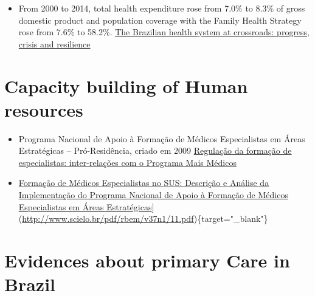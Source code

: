 \documentclass[]{book}
\providecommand{\tightlist}{%
  \setlength{\itemsep}{0pt}\setlength{\parskip}{0pt}}
\begin{document}
\begin{itemize}
\tightlist
\item
  From 2000 to 2014, total health expenditure rose from 7.0\% to 8.3\% of gross domestic product and population coverage with the Family Health Strategy rose from 7.6\% to 58.2\%. \href{https://www.ncbi.nlm.nih.gov/pmc/articles/PMC6035510/pdf/bmjgh-2018-000829.pdf}{The Brazilian health system at crossroads: progress, crisis and resilience}
\end{itemize}

\hypertarget{capacity-building-of-human-resources}{%
\section*{Capacity building of Human resources}\label{capacity-building-of-human-resources}}

\begin{itemize}
\item
  Programa Nacional de Apoio à Formação de Médicos Especialistas em Áreas Estratégicas -- Pró-Residência, criado em 2009 \href{http://www.scielo.br/pdf/physis/v26n2/0103-7331-physis-26-02-00633.pdf}{Regulação da formação de especialistas: inter-relações com o Programa Mais Médicos}
\item
  \href{Pró-Residência}{Formação de Médicos Especialistas no SUS: Descrição e Análise da Implementação do Programa Nacional de Apoio à Formação de Médicos Especialistas em Áreas Estratégicas}{]}(\url{http://www.scielo.br/pdf/rbem/v37n1/11.pdf})\{target="\_blank"\}
\end{itemize}

\hypertarget{evidences-about-primary-care-in-brazil}{%
\section*{Evidences about primary Care in Brazil}\label{evidences-about-primary-care-in-brazil}}
\end{document}

